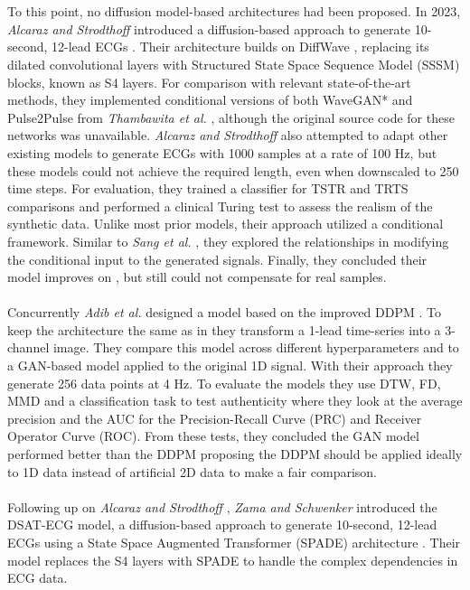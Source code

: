 \\ \\
To this point, no diffusion model-based architectures had been proposed. In 2023, \textit{Alcaraz and Strodthoff} introduced a diffusion-based approach to generate 10-second, 12-lead ECGs \cite{alcaraz_diffusion-based_2023}. Their architecture builds on DiffWave \cite{kong_diffwave_2021}, replacing its dilated convolutional layers with Structured State Space Sequence Model (SSSM) blocks, known as S4 layers. For comparison with relevant state-of-the-art methods, they implemented conditional versions of both WaveGAN* and Pulse2Pulse from \textit{Thambawita et al.} \cite{thambawita_deepfake_2021}, although the original source code for these networks was unavailable. \textit{Alcaraz and Strodthoff} also attempted to adapt other existing models \cite{yoon_time-series_2019, li_tts-gan_2022, sang_generation_2022} to generate ECGs with 1000 samples at a rate of 100 Hz, but these models could not achieve the required length, even when downscaled to 250 time steps. For evaluation, they trained a classifier for TSTR and TRTS comparisons and performed a clinical Turing test to assess the realism of the synthetic data. Unlike most prior models, their approach utilized a conditional framework. Similar to \textit{Sang et al.} \cite{sang_generation_2022}, they explored the relationships in modifying the conditional input to the generated signals. Finally, they concluded their model improves on \cite{thambawita_deepfake_2021}, but still could not compensate for real samples.
\\ \\
Concurrently \textit{Adib et al.} \cite{adib_synthetic_2023} designed a model based on the improved DDPM \cite{nichol_improved_2021}. To keep the architecture the same as in \cite{nichol_improved_2021} they transform a 1-lead time-series into a 3-channel image. They compare this model across different hyperparameters and to a GAN-based model applied to the original 1D signal. With their approach they generate 256 data points at 4 Hz. To evaluate the models they use DTW, FD, MMD and a classification task to test authenticity where they look at the average precision and the AUC for the Precision-Recall Curve (PRC) and Receiver Operator Curve (ROC). From these tests, they concluded the GAN model performed better than the DDPM proposing the DDPM should be applied ideally to 1D data instead of artificial 2D data to make a fair comparison.
\\ \\ 
Following up on \textit{Alcaraz and Strodthoff} \cite{alcaraz_diffusion-based_2023}, \textit{Zama and Schwenker} introduced the DSAT-ECG model, a diffusion-based approach to generate 10-second, 12-lead ECGs using a State Space Augmented Transformer (SPADE) architecture \cite{zama_ecg_2023}. Their model replaces the S4 layers with SPADE to handle the complex dependencies in ECG data.
